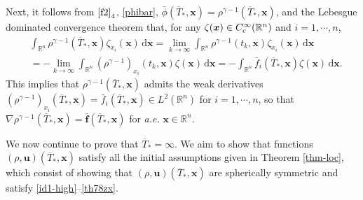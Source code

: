 \documentclass[11pt,reqno]{amsart}
\numberwithin{rk}{section}
\numberwithin{prop}{section}
\numberwithin{mydef}{section}
\numberwithin{lem}{section}
\numberwithin{equation}{section}
\numberwithin{thm}{section}
\begin{document}
Next, it follows from $\eqref{f2}_4$, \eqref{phibar},  $\bar\phi(\overline{T}_*,\boldsymbol{x})=\rho^{\gamma-1} (\overline{T}_*,\boldsymbol{x})$, and the Lebesgue dominated convergence theorem that, for any $\zeta(\boldsymbol{x})\in C^\infty_{\rm c}(\mathbb{R}^n)$ and $i=1,\cdots\!,n$, 
\begin{align*}
&\int_{\mathbb{R}^n}\rho^{\gamma-1}(\overline{T}_*,\boldsymbol{x})\zeta_{x_i}(\boldsymbol{x})\,\mathrm{d}\boldsymbol{x}=\lim_{k\to\infty}\int_{\mathbb{R}^n} \rho^{\gamma-1}(t_k,\boldsymbol{x})\zeta_{x_i}(\boldsymbol{x})\,\mathrm{d}\boldsymbol{x}\\
&=-\lim_{k\to\infty}\int_{\mathbb{R}^n}(\rho^{\gamma-1})_{x_i}(t_k,\boldsymbol{x})\zeta(\boldsymbol{x})\,\mathrm{d}\boldsymbol{x}=-\int_{\mathbb{R}^n}\bar{f}_i(\overline{T}_*,\boldsymbol{x})\zeta(\boldsymbol{x})\,\mathrm{d}\boldsymbol{x}.
\end{align*}
This implies that $\rho^{\gamma-1}(\overline{T}_*,\boldsymbol{x})$ admits the weak derivatives $(\rho^{\gamma-1})_{x_i}(\overline{T}_*,\boldsymbol{x})=\bar{f}_i(\overline{T}_*,\boldsymbol{x})\in L^2(\mathbb{R}^n)$ for $i=1,\cdots\!, n$, so that $\nabla\rho^{\gamma-1}(\overline{T}_*,\boldsymbol{x})=\bar{\boldsymbol{f}}(\overline{T}_*,\boldsymbol{x})$ for {\it a.e.} $\boldsymbol{x}\in \mathbb{R}^n$. 

We now continue to prove that $\overline{T}_*=\infty$. We aim to show that functions 
$(\rho, \boldsymbol{u})(\overline{T}_*,\boldsymbol{x})$ satisfy all the initial assumptions 
given in Theorem \ref{thm-loc}, which consist of showing that 
$(\rho, \boldsymbol{u})(\overline{T}_*,\boldsymbol{x})$ are spherically symmetric 
and satisfy \eqref{id1-high}--\eqref{th78zx}. 
\end{document}
